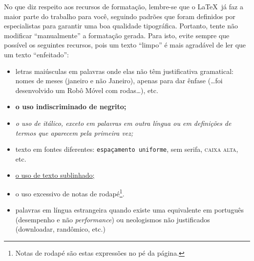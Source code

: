 No que diz respeito aos recursos de formatação, lembre-se que o
\LaTeX\ já faz a maior parte do trabalho para você, seguindo padrões
que foram definidos por especialistas para garantir uma boa qualidade
tipográfica. Portanto, tente não modificar ``manualmente'' a
formatação gerada. Para isto, evite sempre que possível os seguintes
recursos, pois um texto ``limpo'' é mais agradável de ler que um texto
``enfeitado'':
\begin{itemize}
\item letras maiúsculas em palavras onde elas não têm justificativa
gramatical: nomes de meses (janeiro e não Janeiro), apenas para dar
ênfase (\dots foi desenvolvido um Robô Móvel com rodas\dots), etc.
\item \textbf{o uso indiscriminado de negrito;}
\item \textit{o uso de itálico, exceto em palavras em outra língua
ou em definições de termos que aparecem pela primeira vez;}
\item texto em fontes diferentes: \texttt{espaçamento uniforme}, \textsf{sem
serifa}, \textsc{caixa alta}, etc.
\item \underline{o uso de texto sublinhado;}
\item o uso excessivo de notas de rodapé\footnote{Notas de rodapé
são estas expressões no pé da página.}.
\item palavras em língua estrangeira quando existe uma equivalente
em português (desempenho e não \textit{performance}) ou neologismos
não justificados (downloadar, randômico, etc.)
\end{itemize}
